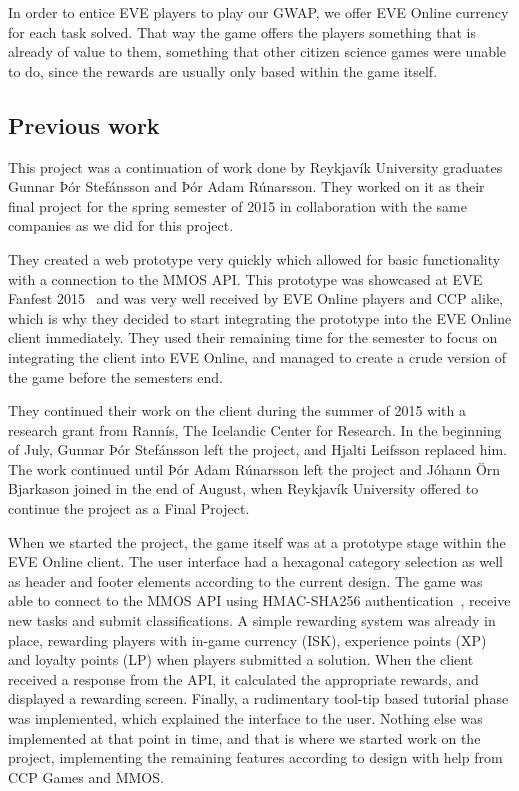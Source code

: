In order to entice EVE players to play our GWAP, we offer EVE Online currency for each task solved. That way the game offers the players something that is already of value to them, something that other citizen science games were unable to do, since the rewards are usually only based within the game itself.

\subsection{Previous work}
This project was a continuation of work done by Reykjavík University graduates Gunnar Þór Stefánsson and Þór Adam Rúnarsson. They worked on it as their final project for the spring semester of 2015 in collaboration with the same companies as we did for this project.

They created a web prototype very quickly which allowed for basic functionality with a connection to the MMOS API. This prototype was showcased at EVE Fanfest 2015~\cite{fanfest} and was very well received by EVE Online players and CCP alike, which is why they decided to start integrating the prototype into the EVE Online client immediately. They used their remaining time for the semester to focus on integrating the client into EVE Online, and managed to create a crude version of the game before the semesters end.

They continued their work on the client during the summer of 2015 with a research grant from Rannís, The Icelandic Center for Research. In the beginning of July, Gunnar Þór Stefánsson left the project, and Hjalti Leifsson replaced him. The work continued until Þór Adam Rúnarsson left the project and Jóhann Örn Bjarkason joined in the end of August, when Reykjavík University offered to continue the project as a Final Project.

When we started the project, the game itself was at a prototype stage within the EVE Online client. The user interface had a hexagonal category selection as well as header and footer elements according to the current design. The game was able to connect to the MMOS API using HMAC-SHA256 authentication~\cite{hmac}, receive new tasks and submit classifications. A simple rewarding system was already in place, rewarding players with in-game currency (ISK), experience points (XP) and loyalty points (LP) when players submitted a solution. When the client received a response from the API, it calculated the appropriate rewards, and displayed a rewarding screen. Finally, a rudimentary tool-tip based tutorial phase was implemented, which explained the interface to the user. Nothing else was implemented at that point in time, and that is where we started work on the project, implementing the remaining features according to design with help from CCP Games and MMOS.
